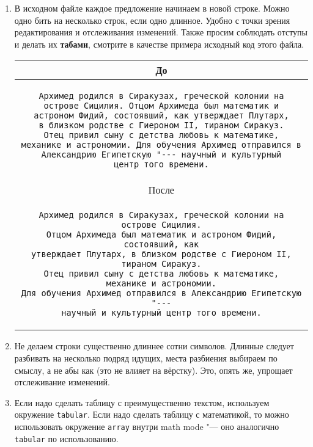 \begin{enumerate}
\item
	В исходном файле каждое предложение начинаем в новой строке.
	Можно одно бить на несколько строк, если одно длинное.
	Удобно с точки зрения редактирования и отслеживания изменений.
	Также просим соблюдать отступы и делать их \textbf{табами}, смотрите в качестве примера исходный код этого файла.

	\begin{center}\begin{tabular}{|c|}
	\hline
	До \\
	\hline
	\begin{minipage}{0.9\textwidth}
\begin{verbatim}
Архимед родился в Сиракузах, греческой колонии на
острове Сицилия. Отцом Архимеда был математик и
астроном Фидий, состоявший, как утверждает Плутарх,
в близком родстве с Гиероном II, тираном Сиракуз.
Отец привил сыну с детства любовь к математике,
механике и астрономии. Для обучения Архимед отправился в
Александрию Египетскую "--- научный и культурный
центр того времени.
\end{verbatim}
	\end{minipage}
	\\
	\hline После \\
	\hline
	\begin{minipage}{0.9\textwidth}
\begin{verbatim}
Архимед родился в Сиракузах, греческой колонии на острове Сицилия.
Отцом Архимеда был математик и астроном Фидий, состоявший, как
утверждает Плутарх, в близком родстве с Гиероном II, тираном Сиракуз.
Отец привил сыну с детства любовь к математике,
механике и астрономии.
Для обучения Архимед отправился в Александрию Египетскую "---
научный и культурный центр того времени.
\end{verbatim}
	\end{minipage} \\
	\hline
	\end{tabular}\end{center}

\item
	Не делаем строки существенно длиннее сотни символов.
	Длинные следует разбивать на несколько подряд идущих, места разбиения выбираем по смыслу, а не абы как (это не влияет на вёрстку).
	Это, опять же, упрощает отслеживание изменений.

\item
	Если надо сделать таблицу с преимущественно текстом, используем окружение \texttt{tabular}.
	Если надо сделать таблицу с математикой, то можно использовать окружение \texttt{array}
	внутри math mode "--- оно аналогично \texttt{tabular} по использованию.


\end{enumerate}
